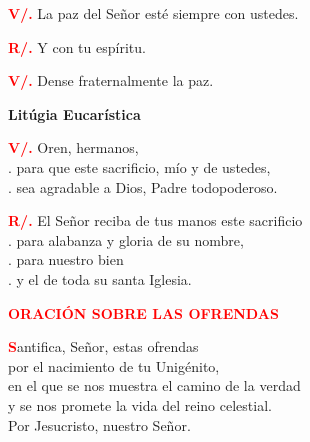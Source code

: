\documentclass[12pt, letterpaper]{report}
\begin{document}
\Large \hspace{-0.9cm} {\bfseries \textcolor{red}{V/.}} \hspace{0.5cm} La paz del Se\~nor est\'e siempre con ustedes. \newline

\Large \hspace{-0.9cm} {\bfseries \textcolor{red}{R/.}} \hspace{0.5cm} Y con tu esp\'iritu. \newline

\Large \hspace{-0.9cm} {\bfseries \textcolor{red}{V/.}} \hspace{0.5cm} Dense fraternalmente la paz. \newline

\newpage

\begin{center}
\Huge {\bfseries Lit\'ugia Eucar\'istica}
\end{center}

\Large \hspace{-0.9cm} {\bfseries \textcolor{red}{V/.}} \hspace{0.5cm} Oren, hermanos, \\
. \hspace{1cm} para que este sacrificio, m\'io y de ustedes, \\
. \hspace{1cm} sea agradable a Dios, Padre todopoderoso. \newline

\Large \hspace{-0.9cm} {\bfseries \textcolor{red}{R/.}} \hspace{0.5cm} El Se\~nor reciba de tus manos este sacrificio \\
. \hspace{1cm} para alabanza y gloria de su nombre, \\
. \hspace{1cm} para nuestro bien \\
. \hspace{1cm} y el de toda su santa Iglesia. \newline

\Large {\bfseries \textcolor{red}{ORACI\'ON SOBRE LAS OFRENDAS}}

\lettrine[lines=1]{\bfseries \textcolor{red}{S}}{}\Large antifica, Se\~nor, estas ofrendas \\
por el nacimiento de tu Unig\'enito, \\
en el que se nos muestra el camino de la verdad \\
y se nos promete la vida del reino celestial. \\
Por Jesucristo, nuestro Se\~nor. \newline
\end{document}
